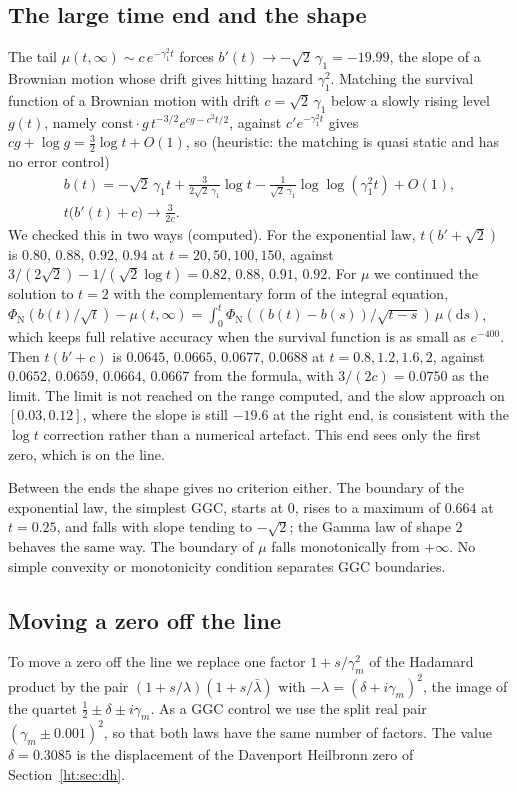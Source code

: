\subsection{The large time end and the shape}
The tail $\mu(t,\infty)\sim c\,e^{-\gamma_1^2t}$ forces $b'(t)\to-\sqrt2\,\gamma_1=-19.99$, the slope of a Brownian motion whose drift gives hitting hazard $\gamma_1^2$. Matching the survival function of a Brownian motion with drift $c=\sqrt2\,\gamma_1$ below a slowly rising level $g(t)$, namely $\mathrm{const}\cdot g\,t^{-3/2}e^{cg-c^2t/2}$, against $c'e^{-\gamma_1^2t}$ gives $cg+\log g=\frac32\log t+O(1)$, so (heuristic: the matching is quasi static and has no error control)
\begin{gather*}
b(t)=-\sqrt2\,\gamma_1t+\frac{3}{2\sqrt2\,\gamma_1}\log t-\frac{1}{\sqrt2\,\gamma_1}\log\log(\gamma_1^2t)+O(1),\\
t\big(b'(t)+c\big)\to\frac3{2c}.
\end{gather*}
We checked this in two ways (computed). For the exponential law, $t(b'+\sqrt2)$ is $0.80$, $0.88$, $0.92$, $0.94$ at $t=20,50,100,150$, against $3/(2\sqrt2)-1/(\sqrt2\log t)=0.82$, $0.88$, $0.91$, $0.92$. For $\mu$ we continued the solution to $t=2$ with the complementary form of the integral equation, $\Phi_{\mathrm N}(b(t)/\sqrt t)-\mu(t,\infty)=\int_0^t\Phi_{\mathrm N}((b(t)-b(s))/\sqrt{t-s})\,\mu(\mathrm ds)$, which keeps full relative accuracy when the survival function is as small as $e^{-400}$. Then $t(b'+c)$ is $0.0645$, $0.0665$, $0.0677$, $0.0688$ at $t=0.8,1.2,1.6,2$, against $0.0652$, $0.0659$, $0.0664$, $0.0667$ from the formula, with $3/(2c)=0.0750$ as the limit. The limit is not reached on the range computed, and the slow approach on $[0.03,0.12]$, where the slope is still $-19.6$ at the right end, is consistent with the $\log t$ correction rather than a numerical artefact. This end sees only the first zero, which is on the line.

Between the ends the shape gives no criterion either. The boundary of the exponential law, the simplest GGC, starts at $0$, rises to a maximum of $0.664$ at $t=0.25$, and falls with slope tending to $-\sqrt2$; the Gamma law of shape $2$ behaves the same way. The boundary of $\mu$ falls monotonically from $+\infty$. No simple convexity or monotonicity condition separates GGC boundaries.

\subsection{Moving a zero off the line}
To move a zero off the line we replace one factor $1+s/\gamma_m^2$ of the Hadamard product by the pair $(1+s/\lambda)(1+s/\bar\lambda)$ with $-\lambda=(\delta+i\gamma_m)^2$, the image of the quartet $\frac12\pm\delta\pm i\gamma_m$. As a GGC control we use the split real pair $(\gamma_m\pm0.001)^2$, so that both laws have the same number of factors. The value $\delta=0.3085$ is the displacement of the Davenport Heilbronn zero of Section~\ref{ht:sec:dh}.

